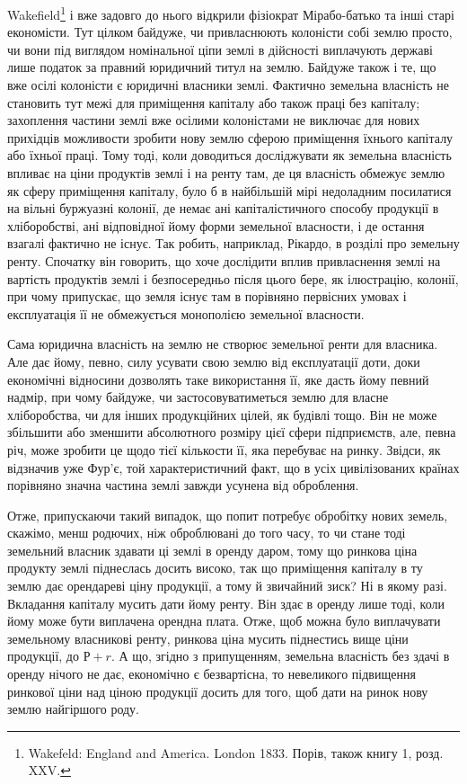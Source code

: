 \parcont{}  %
Wakefield\footnote{
Wakefeld: England and America. London 1833. Порів, також книгу 1, розд. XXV.
} і вже задовго до нього відкрили фізіократ Мірабо-батько та інші
старі економісти. Тут цілком байдуже, чи привласнюють колоністи собі землю
просто, чи вони під виглядом номінальної ціпи землі в дійсності виплачують державі
лише податок за правний юридичний титул на землю. Байдуже також і те, що вже
осілі колоністи є юридичні власники землі. Фактично земельна власність не
становить тут межі для приміщення капіталу або також праці без капіталу;
захоплення частини землі вже осілими колоністами не виключає для нових
прихідців можливости зробити нову землю сферою приміщення їхнього капіталу
або їхньої праці. Тому тоді, коли доводиться досліджувати як земельна власність
впливає на ціни продуктів землі і на ренту там, де ця власність обмежує
землю як сферу приміщення капіталу, було б в найбільшій мірі недоладним
посилатися на вільні буржуазні колонії, де немає ані капіталістичного способу
продукції в хліборобстві, ані відповідної йому форми земельної власности, і де
остання взагалі фактично не існує. Так робить, наприклад, Рікардо, в розділі
про земельну ренту. Спочатку він говорить, що хоче дослідити вплив привласнення
землі на вартість продуктів землі і безпосередньо після цього бере, як
ілюстрацію, колонії, при чому припускає, що земля існує там в порівняно
первісних умовах і експлуатація її не обмежується монополією земельної
власности.

Сама юридична власність на землю не створює земельної ренти для власника.
Але дає йому, певно, силу усувати свою землю від експлуатації доти,
доки економічні відносини дозволять таке використання її, яке дасть йому
певний надмір, при чому байдуже, чи застосовуватиметься землю для власне
хліборобства, чи для інших продукційних цілей, як будівлі тощо. Він не може
збільшити або зменшити абсолютного розміру цієї сфери підприємств, але, певна
річ, може зробити це щодо тієї кількости її, яка перебуває на ринку. Звідси,
як відзначив уже Фур’є, той характеристичний факт, що в усіх цивілізованих
країнах порівняно значна частина землі завжди усунена від оброблення.

Отже, припускаючи такий випадок, що попит потребує обробітку нових
земель, скажімо, менш родючих, ніж оброблювані до того часу, то чи стане
тоді земельний власник здавати ці землі в оренду даром, тому що ринкова
ціна продукту землі піднеслась досить високо, так що приміщення капіталу
в ту землю дає орендареві ціну продукції, а тому й звичайний зиск? Ні в якому
разі. Вкладання капіталу мусить дати йому ренту. Він здає в оренду лише тоді,
коли йому може бути виплачена орендна плата. Отже, щоб можна було виплачувати
земельному власникові ренту, ринкова ціна мусить піднестись вище
ціни продукції, до $Р + r$. А що, згідно з припущенням, земельна власність
без здачі в оренду нічого не дає, економічно є безвартісна, то невеликого підвищення
ринкової ціни над ціною продукції досить для того, щоб дати на ринок
нову землю найгіршого роду.

